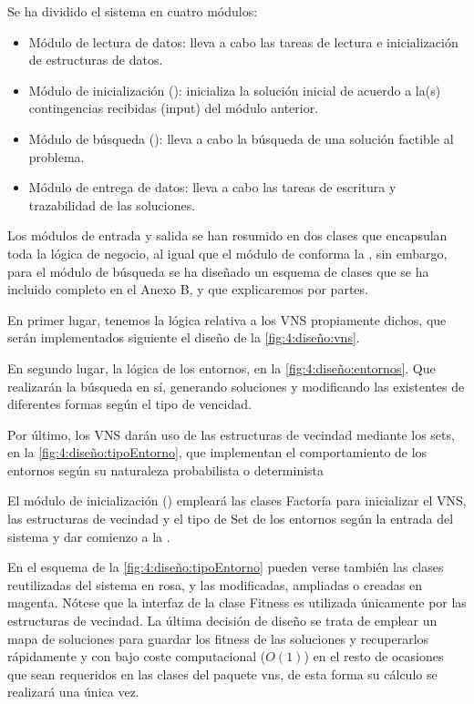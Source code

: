 Se ha dividido el sistema en cuatro módulos:
\begin{itemize}
	\item Módulo de lectura de datos: lleva a cabo las tareas de lectura e inicialización de estructuras de datos.
	\item Módulo de inicialización (\faseuno{}): inicializa la solución inicial de acuerdo a la(s) contingencias recibidas (input) del módulo anterior.
	\item Módulo de búsqueda (\fasedos{}): lleva a cabo la búsqueda de una solución factible al problema.
	\item Módulo de entrega de datos: lleva a cabo las tareas de escritura y trazabilidad de las soluciones.
\end{itemize}

Los módulos de entrada y salida se han resumido en dos clases que encapsulan toda la lógica de negocio, al igual que el módulo de conforma la \faseuno{}, sin embargo, para el módulo de búsqueda se ha diseñado un esquema de clases que se ha incluido completo en el Anexo B, y que explicaremos por partes. %

En primer lugar, tenemos la lógica relativa a los VNS propiamente dichos, que serán implementados siguiente el diseño de la \autoref{fig:4:diseño:vns}.

En segundo lugar, la lógica de los entornos, en la \autoref{fig:4:diseño:entornos}. Que realizarán la búsqueda en sí, generando soluciones y modificando las existentes de diferentes formas según el tipo de vencidad.

Por último, los VNS darán uso de las estructuras de vecindad mediante los sets, en la \autoref{fig:4:diseño:tipoEntorno}, que implementan el comportamiento de los entornos según su naturaleza probabilista o determinista

El módulo de inicialización (\faseuno{}) empleará las clases Factoría para inicializar el VNS, las estructuras de vecindad y el tipo de Set de los entornos según la entrada del sistema y dar comienzo a la \faseuno{}.

En el esquema de la \autoref{fig:4:diseño:tipoEntorno} pueden verse también las clases reutilizadas del sistema \legacy{} en rosa, y las modificadas, ampliadas o creadas en magenta. Nótese que la interfaz de la clase Fitness es utilizada únicamente por las estructuras de vecindad. La última decisión de diseño se trata de emplear un mapa de soluciones para guardar los fitness de las soluciones y recuperarlos rápidamente y con bajo coste computacional ($O(1)$) en el resto de ocasiones que sean requeridos en las clases del paquete vns, de esta forma su cálculo se realizará una única vez.

